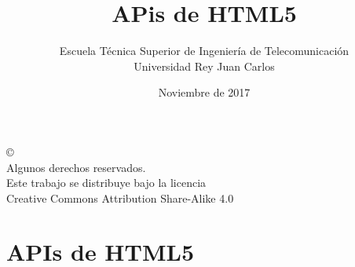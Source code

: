 \documentclass[ucs]{beamer}
\begin{document}
\title[APIs de HTML5]{APis de HTML5}
\author[GSyC]{Escuela Técnica Superior de Ingeniería de Telecomunicación\\
Universidad Rey Juan Carlos}
\date[2017]{Noviembre de 2017}


\begin{frame}
  \titlepage
\end{frame}




\begin{frame}[b]
\begin{flushright}
{\tiny
\copyright \insertshortdate~\insertshortauthor \\
  Algunos derechos reservados. \\
  Este trabajo se distribuye bajo la licencia \\
  Creative Commons Attribution Share-Alike 4.0
}
\end{flushright}
\end{frame}



%

\section{APIs de HTML5}
\end{document}
